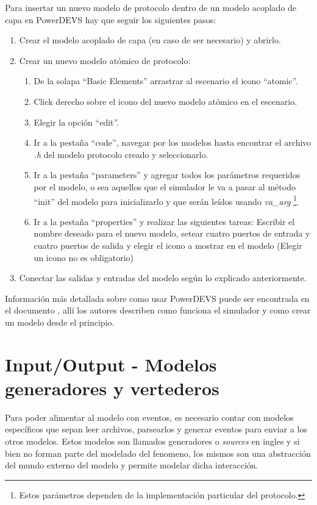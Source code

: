 \documentclass[10pt,a4paper]{article}
\begin{document}
Para insertar un nuevo modelo de protocolo dentro de un modelo acoplado de capa en PowerDEVS hay que seguir los siguientes pasos:

\begin{enumerate}
\item Crear el modelo acoplado de capa (en caso de ser necesario) y abrirlo.
\item Crear un nuevo modelo atómico de protocolo:
\begin{enumerate}
\item De la solapa ``Basic Elements'' arrastrar al escenario el icono ``atomic''.
\item Click derecho sobre el icono del nuevo modelo atómico en el escenario.
\item Elegir la opción  ``edit''.
\item Ir a la pestaña ``code'', navegar por los modelos hasta encontrar el archivo \textit{.h} del modelo protocolo creado y seleccionarlo.
\item Ir a la pestaña ``parameters'' y agregar todos los parámetros requeridos por el modelo, o sea aquellos que el simulador le va a pasar al método ``init'' del modelo para inicializarlo y que serán leídos usando \textit{va\_arg} \footnote{Estos parámetros dependen de la implementación particular del protocolo.}.
\item Ir a la pestaña ``properties'' y realizar las siguientes tareas: Escribir el nombre deseado para el nuevo modelo, setear cuatro puertos de entrada y cuatro puertos de salida y elegir el icono a mostrar en el modelo (Elegir un icono no es obligatorio)
\end{enumerate}
\item Conectar las salidas y entradas del modelo según lo explicado anteriormente.
\end{enumerate}

Información más detallada sobre como usar PowerDEVS puede ser encontrada en el documento \cite{bergero2011powerdevs}, allí los autores describen como funciona el simulador y como crear un modelo desde el principio. \\

\section{Input/Output - Modelos generadores y vertederos} \label{section: I/O}
Para poder alimentar al modelo con eventos, es necesario contar con modelos específicos que sepan leer archivos, parsearlos y generar eventos para enviar a los otros modelos. Estos modelos son llamados generadores o \textit{sources} en ingles y si bien no forman parte del modelado del fenomeno, los mismos son una abstracción del mundo externo del modelo y permite modelar dicha interacción.
\end{document}
